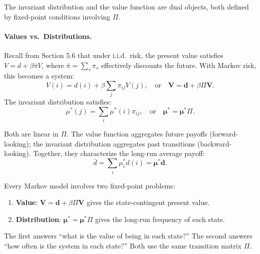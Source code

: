 The invariant distribution and the value function are dual objects, both defined by fixed-point conditions involving $\Pi$.

\paragraph{Values vs.\ Distributions.}
Recall from Section 5.6 that under i.i.d.\ risk, the present value satisfies $V = d + \beta \bar{\pi} V$, where $\bar{\pi} = \sum_s \pi_s$ effectively discounts the future. With Markov risk, this becomes a system:
\begin{equation}
V(i) = d(i) + \beta \sum_{j} \pi_{ij} V(j), \quad \text{or} \quad \mathbf{V} = \mathbf{d} + \beta \Pi \mathbf{V}.
\label{eq:value-markov}
\end{equation}
The invariant distribution satisfies:
\begin{equation}
\mu^*(j) = \sum_{i} \mu^*(i) \pi_{ij}, \quad \text{or} \quad \boldsymbol{\mu}^* = \boldsymbol{\mu}^* \Pi.
\label{eq:distribution-markov}
\end{equation}

Both are linear in $\Pi$. The value function aggregates future payoffs (forward-looking); the invariant distribution aggregates past transitions (backward-looking). Together, they characterize the long-run average payoff:
\begin{equation}
\bar{d} = \sum_{i} \mu_i^* d(i) = \boldsymbol{\mu}^* \mathbf{d}.
\label{eq:long-run-average}
\end{equation}

\begin{calloutimportant}
Every Markov model involves two fixed-point problems:
\begin{enumerate}[label=(\roman*)]
\item \textbf{Value}: $\mathbf{V} = \mathbf{d} + \beta \Pi \mathbf{V}$ gives the state-contingent present value.
\item \textbf{Distribution}: $\boldsymbol{\mu}^* = \boldsymbol{\mu}^* \Pi$ gives the long-run frequency of each state.
\end{enumerate}
The first answers ``what is the value of being in each state?'' The second answers ``how often is the system in each state?'' Both use the same transition matrix $\Pi$.
\end{calloutimportant}

